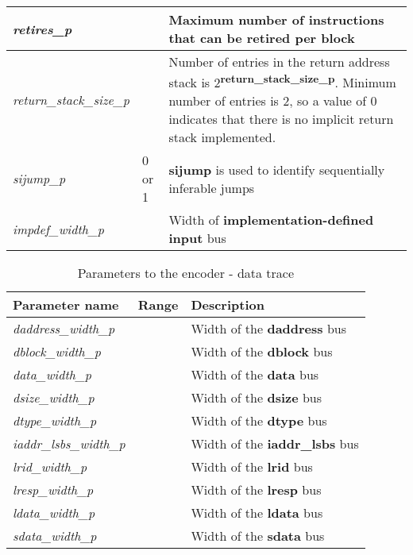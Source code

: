 \begin{table}[h]
\begin{tabulary}{\textwidth}{|l|l|p{100mm}|}
        \hline
        \textit{retires\_p} &  & Maximum number of instructions that can be retired per block \\
        \hline
        \textit{return\_stack\_size\_p} &  & Number of entries in the return address stack is 2\textsuperscript{\textbf{return\_stack\_size\_p}}.
                                    Minimum number of entries is 2, so a value of 0 indicates that there is no implicit return stack implemented.\\
        \hline
        \textit{sijump\_p} & 0 or 1 & \textbf{sijump} is used to identify sequentially inferable jumps\\
        \hline
        \textit{impdef\_width\_p} & & Width of \textbf{implementation-defined input} bus \\
        \hline
    \end{tabulary}
\end{table}

\FloatBarrier

\begin{table}[h]
    \centering
    \caption{Parameters to the encoder - data trace}
    \label{tab:dparameters}
    \begin{tabulary}{\textwidth}{|l|l|p{100mm}|}
        \hline
        \textbf{Parameter name} & \textbf{Range} & \textbf{Description} \\
        \hline
        \textit{daddress\_width\_p} & & Width of the \textbf{daddress} bus\\
        \hline
        \textit{dblock\_width\_p} & & Width of the \textbf{dblock} bus\\
        \hline
        \textit{data\_width\_p}   & & Width of the \textbf{data} bus\\
        \hline
        \textit{dsize\_width\_p}  & & Width of the \textbf{dsize} bus\\
        \hline
        \textit{dtype\_width\_p}  & & Width of the \textbf{dtype} bus\\
        \hline
        \textit{iaddr\_lsbs\_width\_p} & & Width of the \textbf{iaddr\_lsbs} bus\\
        \hline
        \textit{lrid\_width\_p}  & & Width of the \textbf{lrid} bus\\
        \hline
        \textit{lresp\_width\_p} & & Width of the \textbf{lresp} bus\\
        \hline
        \textit{ldata\_width\_p} & & Width of the \textbf{ldata} bus\\
        \hline
        \textit{sdata\_width\_p} & & Width of the \textbf{sdata} bus\\
        \hline
    \end{tabulary}
\end{table}

